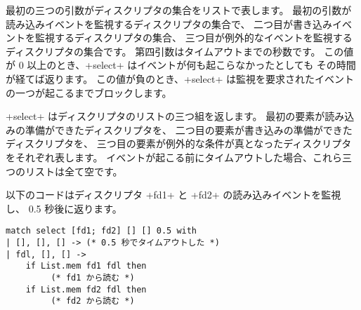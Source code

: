 最初の三つの引数がディスクリプタの集合をリストで表します。
最初の引数が読み込みイベントを監視するディスクリプタの集合で、
二つ目が書き込みイベントを監視するディスクリプタの集合、
三つ目が例外的なイベントを監視するディスクリプタの集合です。
第四引数はタイムアウトまでの秒数です。
この値が 0 以上のとき、\ml+select+ はイベントが何も起こらなかったとしても
その時間が経てば返ります。
この値が負のとき、\ml+select+ は監視を要求されたイベントの一つが起こるまでブロックします。

\ml+select+ はディスクリプタのリストの三つ組を返します。
最初の要素が読み込みの準備ができたディスクリプタを、
二つ目の要素が書き込みの準備ができたディスクリプタを、
三つ目の要素が例外的な条件が真となったディスクリプタをそれぞれ表します。
イベントが起こる前にタイムアウトした場合、これら三つのリストは全て空です。

\begin{example}
以下のコードはディスクリプタ \ml+fd1+ と \ml+fd2+ の読み込みイベントを監視し、 0.5 秒後に返ります。
\begin{lstlisting}
match select [fd1; fd2] [] [] 0.5 with
| [], [], [] -> (* 0.5 秒でタイムアウトした *)
| fdl, [], [] ->
    if List.mem fd1 fdl then
         (* fd1 から読む *)
    if List.mem fd2 fdl then
         (* fd2 から読む *)
\end{lstlisting}
\end{example}

